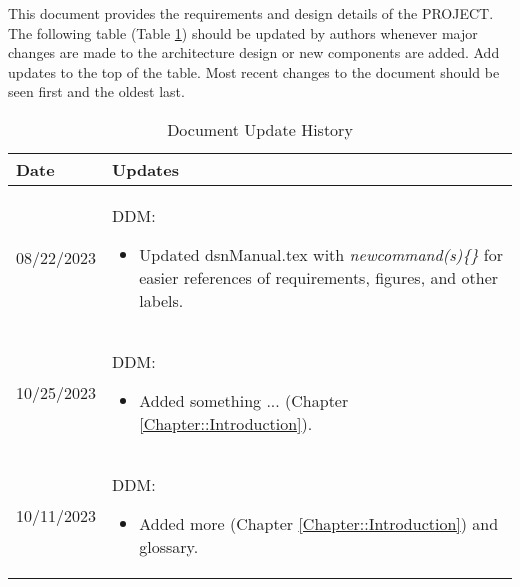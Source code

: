 This document provides the requirements and design details of the
PROJECT.  The following table (Table \ref{Table::UpdateHistory}) should be
updated by authors whenever major changes are made to the architecture
design or new components are added. Add updates to the top of the table.  
Most recent changes to the document should be seen first and the oldest 
last.

\begin{longtable}{|l||p{13.5cm}|}
\caption{Document Update History \label{Table::UpdateHistory}}\\
\hline
\textbf{Date} & \textbf{Updates} \\
\hline 
\endhead

08/22/2023 & DDM:
\begin{itemize}[topsep=0pt,itemsep=0pt,parsep=0pt,partopsep=0pt,leftmargin=12pt]
\item Updated dsnManual.tex with \textit{newcommand(s)\{\}} for easier references of requirements, 
figures, and other labels.
\end{itemize} 
\\ \hline

10/25/2023 & DDM:
\begin{itemize}[topsep=0pt,itemsep=0pt,parsep=0pt,partopsep=0pt,leftmargin=12pt]
\item Added something ... (Chapter \ref{Chapter::Introduction}).
\end{itemize} 
\\ \hline

10/11/2023 & DDM:
\begin{itemize}[topsep=0pt,itemsep=0pt,parsep=0pt,partopsep=0pt,leftmargin=12pt]
\item Added more (Chapter \ref{Chapter::Introduction}) 
and glossary.
\end{itemize} 
\\ \hline


\end{longtable}



